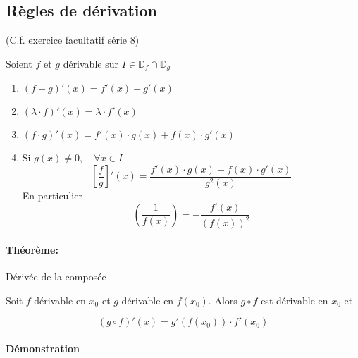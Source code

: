 \documentclass[
    11pt,
    a4paper,
    oneside,
    headinlcude, footinclude,
    twoside,
]{report}
\begin{document}
\subsection{Règles de dérivation}
\label{sub:_regles_de_derivation}

(C.f. exercice facultatif série 8)

Soient $f$ et $g$ dérivable sur $I \in \mathbb{D}_{f} \cap \mathbb{D}_{g}$ 

\begin{enumerate}
    \item $(f + g)' (x) = f'(x) + g'(x)$
    \item $(\lambda \cdot f)' (x) = \lambda \cdot f'(x)$
    \item $(f \cdot g)' (x) = f'(x) \cdot g(x) + f(x) \cdot g'(x)$
    \item Si $g(x) \neq 0, \quad \forall x \in I$
        $$\left[\frac{f}{g}\right]' (x) = \frac{f'(x) \cdot g(x) - f(x) \cdot
        g'(x)}{g^{2}(x)}$$
        En particulier 
        $$\left(\frac{1}{f(x)}\right) = - \frac{f'(x)}{(f(x))^{2}}$$
\end{enumerate}


\paragraph{Théorème:}
Dérivée de la composée

Soit $f$ dérivable en $x_{0}$ et $g$ dérivable en $f(x_{0})$. Alors $g \circ f$
est dérivable en $x_{0}$ et 
\begin{highlightBox}[frametitle={Dérivée de la composée}]
    $$(g \circ f)' (x) = g'(f(x_{0})) \cdot f'(x_{0})$$
\end{highlightBox}

\paragraph{Démonstration}
\label{par:demonstration}
\end{document}
